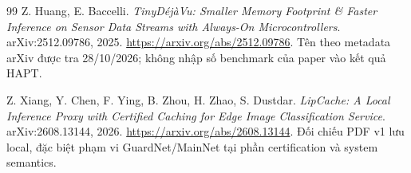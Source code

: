 \documentclass[11pt,a4paper]{article}
\theoremstyle{remark}
\begin{document}
\begin{thebibliography}{99}
 Z. Huang, E. Baccelli.
\emph{TinyD\'ej\`aVu: Smaller Memory Footprint \& Faster Inference on Sensor
Data Streams with Always-On Microcontrollers}. arXiv:2512.09786, 2025.
\url{https://arxiv.org/abs/2512.09786}. Tên theo metadata arXiv được tra
28/10/2026; không nhập số benchmark của paper vào kết quả HAPT.

 Z. Xiang, Y. Chen, F. Ying, B. Zhou, H. Zhao, S. Dustdar.
\emph{LipCache: A Local Inference Proxy with Certified Caching for Edge
Image Classification Service}. arXiv:2608.13144, 2026.
\url{https://arxiv.org/abs/2608.13144}. Đối chiếu PDF v1 lưu local,
đặc biệt phạm vi GuardNet/MainNet tại phần certification và system semantics.
\end{thebibliography}

\endgroup
\end{document}
